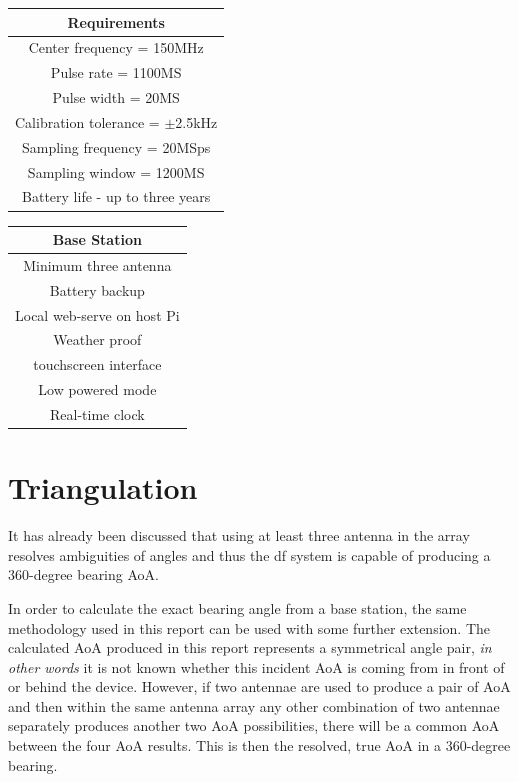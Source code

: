 \documentclass[class=report,11pt,crop=false]{standalone}
\begin{document}
\begin{minipage}[t]{.5\linewidth}\centering
\begin{center}
    \begin{tabular}{c}
        \textbf{Requirements} \\
        \hline
        Center frequency = 150MHz \\
        Pulse rate = 1100MS \\
        Pulse width = 20MS \\
        Calibration tolerance = $\pm$2.5kHz \\
        Sampling frequency = 20MSps \\
        Sampling window = 1200MS \\
        Battery life - up to three years \\
    \end{tabular}
\end{center}
\end{minipage}%
\hspace{0.5cm}
\begin{minipage}[t]{.5\linewidth}\centering
\begin{center}
    \begin{tabular}{c}
        \textbf{Base Station}  \\
        \hline
        Minimum three antenna \\
        Battery backup \\
        Local web-serve on host Pi \\
        Weather proof \\
        touchscreen interface \\
        Low powered mode \\
        Real-time clock \\
    \end{tabular}
\end{center}
\end{minipage}

\section{Triangulation}
It has already been discussed that using at least three antenna in the array resolves ambiguities of angles and thus the \gls{df} system is capable of producing a 360-degree bearing \gls{AoA}.

In order to calculate the exact bearing angle from a base station, the same methodology used in this report can be used with some further extension. The calculated \gls{AoA} produced in this report represents a symmetrical angle pair, \emph{in other words} it is not known whether this incident \gls{AoA} is coming from in front of or behind the device. However, if two antennae are used to produce a pair of \gls{AoA} and then within the same antenna array any other combination of two antennae separately produces another two \gls{AoA} possibilities, there will be a common \gls{AoA} between the four \gls{AoA} results. This is then the resolved, true \gls{AoA} in a 360-degree bearing. 
\end{document}

